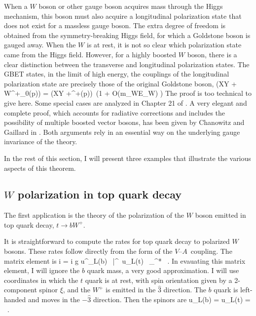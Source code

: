 \documentclass[12pt]{article}
\def\VmA{ $V$--$A$}
\begin{document}
When a $W$ boson or other gauge boson acquires mass through 
the Higgs mechanism, this boson must also acquire a longitudinal
polarization state that does not exist for a massless gauge boson.
The extra degree of freedom is obtained from the symmetry-breaking
Higgs field, for which a Goldstone boson is gauged away.  
When the $W$ is at rest, it is not so clear which polarization state
came from the Higgs field.  However, for a highly boosted $W$ boson,
there is a clear distinction between the transverse and longitudinal
polarization states.   The GBET states, in the limit of high energy,
the couplings of the longitudinal polarization state are precisely
those of the original Goldstone boson,
\beq
  \M(X\to Y + W^+_0(p)) = \M(X\to Y +\pi^+(p))\  \bigl(1 + {\cal
    O}({m_W\over E_W}) \bigr)
The proof is too technical to give here. Some special cases are
analyzed in Chapter 21 of \cite{PeskinSchr}.   A very elegant and complete
proof, which accounts for  radiative corrections and includes the
possibility of multiple boosted vector bosons, 
 has been given by Chanowitz and Gaillard in \cite{CG}.   Both arguments
 rely  in an essential way on the underlying  gauge invariance of the theory.

In the rest of this section, I will present three examples that
illustrate the various aspects of this theorem.





\subsection{$W$ polarization in top quark decay}

The first application is the theory of the polarization of the $W$
boson emitted in top quark decay, $t \to b W^+$. 

It is straightforward to compute the rates for top quark decay to
polarized $W$ bosons.   These rates follow directly from the form of
the \VmA \ coupling.   The matrix element is 
\beq
  i \M =  i {g\over {}} u^\dagger_L(b) \ \bar \sigma^\mu \
  u_L(t) \ \eps_\mu^*  \ .
\eeqn
  In evauating this matrix element, I will ignore
the $b$ quark mass, a very good approximation.  I will use coordinates
in which the $t$ quark is at rest, with spin orientation given by a
2-component spinor $\xi$, and the $W^+$ is emitted in the $\hat 3$
direction.   The $b$ quark is left-handed and moves in the $-\hat
3$ direction.   Then the spinors are 
\beq
        u_L(b)  =  \pmatrix{-1\cr 0\cr} \qquad u_L(t) =
        \sqrt{m_t} \xi \ . 
\eeqn
\end{document}
